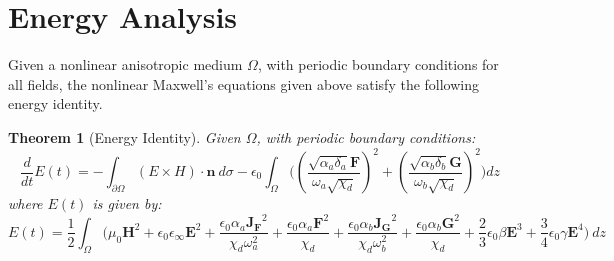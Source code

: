 \documentclass{article}[12pt]
\theoremstyle{plain}
\newtheorem{thm}{Theorem}
\begin{document}
\section{Energy Analysis}
\label{section:energy_analysis}
Given a nonlinear anisotropic medium $\Omega$, with periodic boundary conditions for all fields, the 
nonlinear Maxwell's equations given above satisfy the following energy identity.
\begin{thm}[Energy Identity]
Given $\Omega$, with periodic boundary conditions:
\[
\frac{d}{dt} E(t) = -\int_{\partial\Omega} (E\times H)\cdot \mathbf{n}\ d\sigma 
- \epsilon_0 \int_\Omega \Big( (\frac{\sqrt{\alpha_a\delta_a}\mathbf{F}}{\omega_a\sqrt{\chi_d}})^2 +
(\frac{\sqrt{\alpha_b\delta_b}\mathbf{G}}{\omega_b\sqrt{\chi_d}})^2 \Big) dz
\]
where $E(t)$ is given by:
\[
E(t) = \frac{1}{2} \int_\Omega \Big(\mu_0\mathbf{H}^2 + \epsilon_0\epsilon_\infty \mathbf{E}^2 
 + \frac{\epsilon_0\alpha_a\mathbf{J_F}^2}{\chi_d\omega^2_a} 
+ \frac{\epsilon_0\alpha_a\mathbf{F}^2}{\chi_d}
+ \frac{\epsilon_0\alpha_b\mathbf{J_G}^2}{\chi_d\omega^2_b} 
+ \frac{\epsilon_0\alpha_b\mathbf{G}^2}{\chi_d}
+\frac{2}{3}\epsilon_0\beta \mathbf{E}^3
+\frac{3}{4}\epsilon_0\gamma \mathbf{E}^4
\Big)\ dz
\]
\end{thm}
\end{document}
